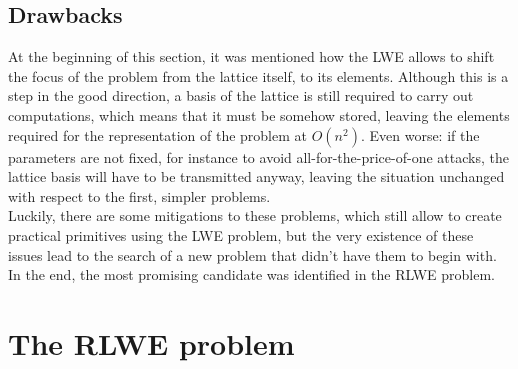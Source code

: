 \subsection{Drawbacks}
At the beginning of this section, it was mentioned how the LWE allows to shift the focus of the problem from the lattice itself, to its elements. Although this is a step in the good direction, a basis of the lattice is still required to carry out computations, which means that it must be somehow stored, leaving the elements required for the representation of the problem at $O(n^2)$. Even worse: if the parameters are not fixed, for instance to avoid all-for-the-price-of-one attacks, the lattice basis will have to be transmitted anyway, leaving the situation unchanged with respect to the first, simpler problems.\\
Luckily, there are some mitigations to these problems, which still allow to create practical primitives using the LWE problem, but the very existence of these issues lead to the search of a new problem that didn't have them to begin with. In the end, the most promising candidate was identified in the RLWE problem.

\section{The RLWE problem}



